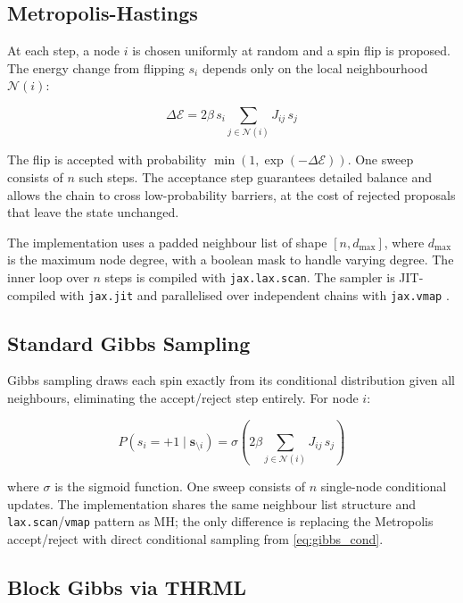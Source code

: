 \documentclass[conference]{IEEEtran}
\begin{document}
\subsection{Metropolis-Hastings}

At each step, a node $i$ is chosen uniformly at random and a spin flip is proposed. The energy change from flipping $s_i$ depends only on the local neighbourhood $\mathcal{N}(i)$:

\begin{equation}
  \Delta\mathcal{E} = 2\beta\, s_i \sum_{j \in \mathcal{N}(i)} J_{ij}\, s_j
  \label{eq:dE}
\end{equation}

The flip is accepted with probability $\min(1, \exp(-\Delta\mathcal{E}))$. One sweep consists of $n$ such steps. The acceptance step guarantees detailed balance and allows the chain to cross low-probability barriers, at the cost of rejected proposals that leave the state unchanged.

The implementation uses a padded neighbour list of shape $[n, d_{\max}]$, where $d_{\max}$ is the maximum node degree, with a boolean mask to handle varying degree. The inner loop over $n$ steps is compiled with \texttt{jax.lax.scan}. The sampler is JIT-compiled with \texttt{jax.jit} and parallelised over independent chains with \texttt{jax.vmap} \cite{jax}.

\subsection{Standard Gibbs Sampling}

Gibbs sampling draws each spin exactly from its conditional distribution given all neighbours, eliminating the accept/reject step entirely. For node $i$:

\begin{equation}
  P(s_i = +1 \mid \mathbf{s}_{\setminus i}) = \sigma\!\left(2\beta \sum_{j \in \mathcal{N}(i)} J_{ij}\, s_j\right)
  \label{eq:gibbs_cond}
\end{equation}

where $\sigma$ is the sigmoid function. One sweep consists of $n$ single-node conditional updates. The implementation shares the same neighbour list structure and \texttt{lax.scan}/\texttt{vmap} pattern as MH; the only difference is replacing the Metropolis accept/reject with direct conditional sampling from \eqref{eq:gibbs_cond}.

\subsection{Block Gibbs via THRML}
\end{document}
